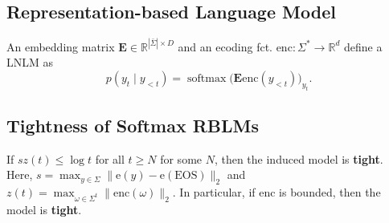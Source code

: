 \subsection*{Representation-based Language Model}
An embedding matrix $\mathbf{E}\in\mathbb{R}^{|\bar{\Sigma}|\times D}$ and an ecoding fct. $\text{enc}:\Sigma^*\rightarrow\mathbb{R}^d$ define a LNLM as $$p(y_t\mid y_{<t})=\operatorname{softmax}\big(\mathbf{E}\text{enc}(y_{<t})\big)_{y_t}.$$

\subsection*{Tightness of Softmax RBLMs}
If $sz(t)\leq \log t$ for all $t\geq N$ for some $N$, then the induced model is \textbf{tight}. Here, $s=\max_{y\in\Sigma} \|\text{e}(y)-\text{e}(\text{EOS})\|_2$ and $z(t)=\max_{\omega\in\Sigma^t}\|\text{enc}(\omega)\|_2$. In particular, if $\text{enc}$ is bounded, then the model is \textbf{tight}.